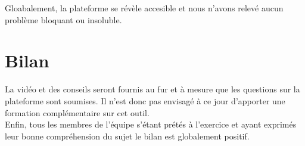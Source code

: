 Gloabalement, la plateforme se révèle accesible et nous n'avons relevé aucun problème bloquant ou insoluble.

\section{Bilan}

La vidéo et des conseils seront fournis au fur et à mesure que les questions sur la plateforme sont soumises. Il n'est donc pas envisagé à ce jour d'apporter une formation complémentaire sur cet outil. \\
Enfin, tous les membres de l'équipe s'étant prétés à l'exercice et ayant exprimés leur bonne compréhension du sujet le bilan est globalement positif.

